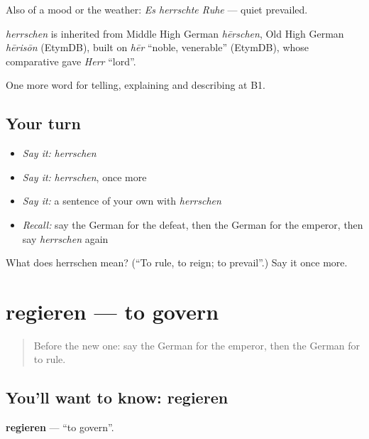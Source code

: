 Also of a mood or the weather: \emph{Es herrschte Ruhe} — quiet prevailed.

\begin{cousinweb}
\emph{herrschen} is inherited from Middle High German \emph{hērschen}, Old High German \emph{hērisōn} (EtymDB), built on \emph{hēr} \textquotedblleft{}noble, venerable\textquotedblright{} (EtymDB), whose comparative gave \emph{Herr} \textquotedblleft{}lord\textquotedblright{}.
\end{cousinweb}

\begin{grammarlens}[title={What you've built}]
One more word for telling, explaining and describing at B1.
\end{grammarlens}

\subsection*{Your turn}
\begin{itemize}
\raggedright
  \item \emph{Say it:} \emph{herrschen}
  \item \emph{Say it:} \emph{herrschen}, once more
  \item \emph{Say it:} a sentence of your own with \emph{herrschen}
  \item \emph{Recall:} say the German for the defeat, then the German for the emperor, then say \emph{herrschen} again
\end{itemize}

\begin{tcolorbox}[breakable,colback=teal!4,colframe=teal!35!black,title={Before you move on}]
What does herrschen mean? (\textquotedblleft{}To rule, to reign; to prevail\textquotedblright{}.) Say it once more.
\end{tcolorbox}
\section[regieren]{regieren — to govern}

\label{lesson:GE-C319-regieren}



\begin{quote}
Before the new one: say the German for the emperor, then the German for to rule.
\end{quote}

\subsection*{You'll want to know: regieren}
\textbf{regieren} — \textquotedblleft{}to govern\textquotedblright{}.

